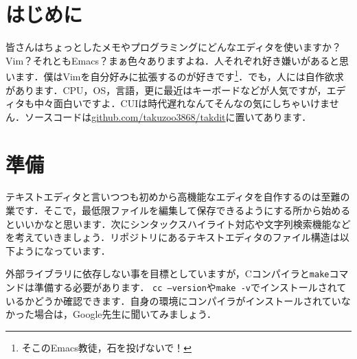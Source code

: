 \section{はじめに}
皆さんはちょっとしたメモやプログラミングにどんなエディタを使いますか？Vim？それともEmacs？まぁ色々ありますよね．人それぞれ好き嫌いがあると思います．僕はVimを自分好みに拡張するのが好きです\footnote{そこのEmacs教徒，石を投げないで！}．でも，人には自作欲求があります．CPU，OS，言語，更に最近はキーボードなどが人気ですが，エディタも中々面白いですよ．CUIは時代遅れなんてそんなの気にしちゃいけません．ソースコードは\href{https://github.com/takuzoo3868/takdit}{github.com/takuzoo3868/takdit}に置いてあります．

\section{準備}
テキストエディタと言いつつも初めから高機能なエディタを自作するのは至難の業です．そこで，最低限ファイルを編集して保存できるようにする所から始めるといいかなと思います．次にシンタックスハイライト対応や文字列検索機能などを考えていきましょう．リポジトリにあるテキストエディタのファイル構造は以下ようになっています．
\begin{figure}[H]
\end{figure}
外部ライブラリに依存しない事を目標としていますが，Cコンパイラと\texttt{make}コマンドは準備する必要があります．
\texttt{cc --version}や\texttt{make -v}でインストールされているかどうか確認できます．自身の環境にコンパイラがインストールされていなかった場合は，Google先生に聞いてみましょう．

